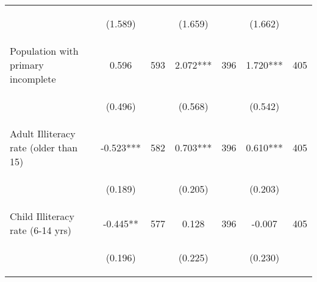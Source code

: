 \begin{tabular}{lcccccc}
\vspace{4pt} &  \begin{footnotesize}(1.589)\end{footnotesize}   & &
			    \begin{footnotesize}(1.659)\end{footnotesize}   & &
			    \begin{footnotesize}(1.662)\end{footnotesize}   &
			     \\          

Population with primary incomplete   &  0.596   &  593  &   2.072***  &  396 &  1.720***  &  405   \\

\vspace{4pt} &  \begin{footnotesize}(0.496)\end{footnotesize}   & &
			    \begin{footnotesize}(0.568)\end{footnotesize}   & &
			    \begin{footnotesize}(0.542)\end{footnotesize}   &
			     \\          

Adult Illiteracy rate (older than 15)   &  -0.523***   &  582  &   0.703***  &  396 &  0.610***  &  405   \\

\vspace{4pt} &  \begin{footnotesize}(0.189)\end{footnotesize}   & &
			    \begin{footnotesize}(0.205)\end{footnotesize}   & &
			    \begin{footnotesize}(0.203)\end{footnotesize}   &
			     \\          

Child Illiteracy rate (6-14 yrs)   &  -0.445**   &  577  &   0.128  &  396 &  -0.007  &  405   \\

\vspace{4pt} &  \begin{footnotesize}(0.196)\end{footnotesize}   & &
			    \begin{footnotesize}(0.225)\end{footnotesize}   & &
			    \begin{footnotesize}(0.230)\end{footnotesize}   &
			     \\          


\end{tabular}
